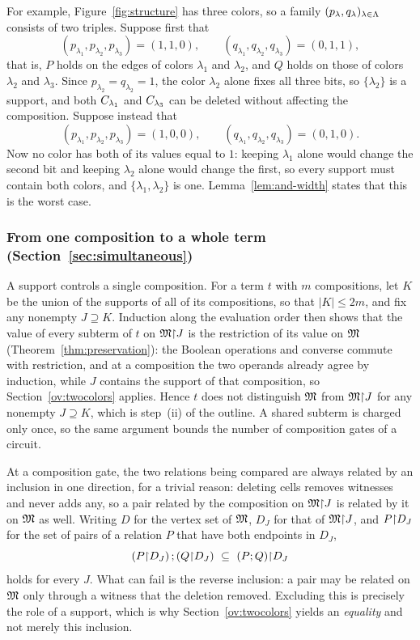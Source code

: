 For example, Figure~\ref{fig:structure} has three colors, so a family
$(p_\lambda,q_\lambda)_{\lambda\in\Lambda}$ consists of two triples. Suppose
first that
\[
 (p_{\lambda_1},p_{\lambda_2},p_{\lambda_3})=(1,1,0),
 \qquad
 (q_{\lambda_1},q_{\lambda_2},q_{\lambda_3})=(0,1,1),
\]
that is, $P$ holds on the edges of colors $\lambda_1$ and $\lambda_2$, and
$Q$ holds on those of colors $\lambda_2$ and $\lambda_3$. Since
$p_{\lambda_2}=q_{\lambda_2}=1$, the color $\lambda_2$ alone fixes all three
bits, so $\{\lambda_2\}$ is a support, and both $C_{\lambda_1}$ and
$C_{\lambda_3}$ can be deleted without affecting the composition. Suppose
instead that
\[
 (p_{\lambda_1},p_{\lambda_2},p_{\lambda_3})=(1,0,0),
 \qquad
 (q_{\lambda_1},q_{\lambda_2},q_{\lambda_3})=(0,1,0).
\]
Now no color has both of its values equal to $1$: keeping $\lambda_1$ alone
would change the second bit and keeping $\lambda_2$ alone would change the
first, so every support must contain both colors, and
$\{\lambda_1,\lambda_2\}$ is one. Lemma~\ref{lem:and-width} states that this
is the worst case.

\subsubsection{From one composition to a whole term (Section~\ref{sec:simultaneous})}\label{ov:wholeterm}
A support controls a single composition. For a term $t$ with $m$
compositions, let $K$ be the union of the supports of all of its
compositions, so that $|K|\le2m$, and fix any nonempty $J\supseteq K$.
Induction along the evaluation order then shows that the value of every
subterm of $t$ on $\mathfrak M\mathord{\restriction} J$ is the restriction of its value on $\mathfrak M$
(Theorem~\ref{thm:preservation}): the Boolean operations and converse
commute with restriction, and at a composition the two operands already
agree by induction, while $J$ contains the support of that composition, so
Section~\ref{ov:twocolors} applies. Hence $t$ does not distinguish $\mathfrak M$ from
$\mathfrak M\mathord{\restriction} J$ for any nonempty $J\supseteq K$, which is step~(ii) of the
outline. A shared subterm is charged only once, so the same argument bounds
the number of composition gates of a circuit.

At a composition gate, the two relations being compared are always related
by an inclusion in one direction, for a trivial reason: deleting cells
removes witnesses and never adds any, so a pair related by the composition
on $\mathfrak M\mathord{\restriction} J$ is related by it on $\mathfrak M$ as well. Writing $D$ for the vertex
set of $\mathfrak M$, $D_J$ for that of $\mathfrak M\mathord{\restriction} J$, and $P\mathord{\restriction} D_J$ for the set of
pairs of a relation $P$ that have both endpoints in $D_J$,
\[
 (P\res D_J)\,;(Q\res D_J)\ \subseteq\ (P;Q)\res D_J
\]
holds for every $J$. What can fail is the reverse inclusion: a pair may be
related on $\mathfrak M$ only through a witness that the deletion removed. Excluding
this is precisely the role of a support, which is why
Section~\ref{ov:twocolors} yields an \emph{equality} and not merely this
inclusion.

